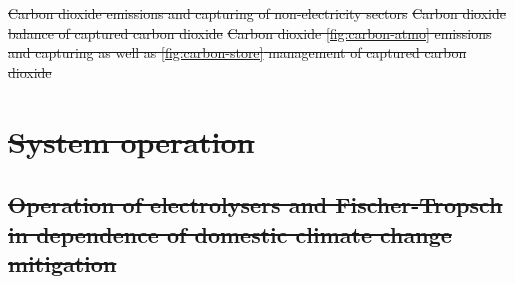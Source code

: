 \documentclass[5p,numafflabel]{elsarticle}
\def\runstandard{decr_13_3H_ws} %
\providecommand{\DIFdeltex}[1]{{\protect\color{red}\sout{#1}}}                      %
\providecommand{\DIFdelFL}[1]{\DIFdel{#1}} %
\providecommand{\DIFdel}[1]{\texorpdfstring{\DIFdeltex{#1}}{}} %
\begin{document}
{%
\DIFdelFL{Carbon dioxide emissions and capturing of non-electricity sectors}}
{%
\DIFdelFL{Carbon dioxide balance of captured carbon dioxide}}
{%
\DIFdelFL{Carbon dioxide \ref{fig:carbon-atmo} emissions and capturing as well as \ref{fig:carbon-store} management of captured carbon dioxide}}

\section{\DIFdel{System operation}}
\addtocounter{section}{-1}%

\subsection{\DIFdel{Operation of electrolysers and Fischer-Tropsch in dependence of domestic climate change mitigation}}
\addtocounter{subsection}{-1}%
\end{document}
